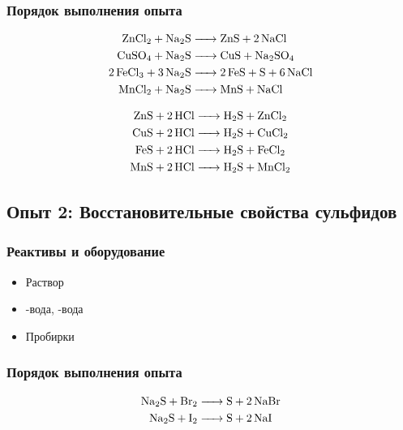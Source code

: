 \documentclass[a4paper, 12pt]{article}
\begin{document}
\subsubsection{Порядок выполнения опыта}

\begin{align}
	\ce{ZnCl2 + Na2S &-> ZnS + 2 NaCl}\\
	\ce{CuSO4 + Na2S &-> CuS + Na2SO4}\\
	\ce{2FeCl3 + 3Na2S &-> 2 FeS + S + 6 NaCl}\\
	\ce{MnCl2 + Na2S &->  MnS + NaCl}
\end{align}

\begin{align}
	\ce{ZnS + 2HCl &-> H2S + ZnCl2}\\
	\ce{CuS + 2HCl &-> H2S + CuCl2}\\
	\ce{FeS + 2HCl &-> H2S + FeCl2}\\
	\ce{MnS + 2HCl &-> H2S + MnCl2}
\end{align}

\subsection{Опыт 2: Восстановительные свойства сульфидов}

\subsubsection{Реактивы и оборудование}

\begin{itemize}
	\item Раствор 
	
	\item {}-вода, -вода
	
	\item Пробирки
\end{itemize}

\subsubsection{Порядок выполнения опыта}

\begin{align}
	\ce{Na2S + Br2 &-> S + 2NaBr}\\
	\ce{Na2S + I2 &-> S + 2NaI}
\end{align}

\end{document}

